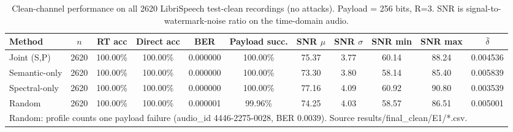 \begin{table}[t]
\centering
\caption{Clean-channel performance on all 2620 LibriSpeech test-clean recordings (no attacks). Payload = 256 bits, R=3. SNR is signal-to-watermark-noise ratio on the time-domain audio.}
\label{tab:clean-e1}
\scriptsize
\begin{tabular}{lcccccccccc}
\toprule
\textbf{Method} & \textbf{$n$} & \textbf{RT acc} & \textbf{Direct acc} & \textbf{BER} & \textbf{Payload succ.} & \textbf{SNR $\mu$} & \textbf{SNR $\sigma$} & \textbf{SNR min} & \textbf{SNR max} & \textbf{$\bar{\delta}$} \\
\midrule
Joint (S,P) & 2620 & 100.00\% & 100.00\% & 0.000000 & 100.00\% & 75.37 & 3.77 & 60.14 & 88.24 & 0.004536 \\
Semantic-only & 2620 & 100.00\% & 100.00\% & 0.000000 & 100.00\% & 73.30 & 3.80 & 58.14 & 85.40 & 0.005839 \\
Spectral-only & 2620 & 100.00\% & 100.00\% & 0.000000 & 100.00\% & 77.16 & 4.09 & 60.92 & 90.80 & 0.003539 \\
Random & 2620 & 100.00\% & 100.00\% & 0.000001 & 99.96\% & 74.25 & 4.03 & 58.57 & 86.51 & 0.005001 \\
\bottomrule
\multicolumn{11}{l}{\footnotesize Random: profile counts one payload failure (audio_id 4446-2275-0028, BER 0.0039). Source results/final_clean/E1/*.csv.}\\
\end{tabular}
\end{table}
